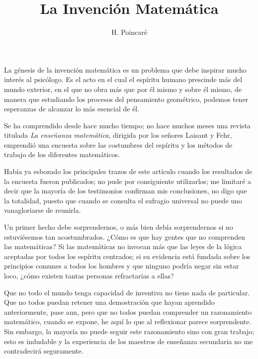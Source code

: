 \documentclass[a4paper, 12pt, draft]{article}
\title{La Invención Matemática}
\author{H. Poincaré}
\date{}
\begin{document}
\begin{tcolorbox}[colback=blue!5!white,colframe=blue!75!black]

\vspace{-1.8cm}
\textbf \maketitle

\end{tcolorbox}

\bigskip


La génesis de la invención matemática es un problema que debe
inspirar mucho interés al psicólogo. Es el acto en el cual el espíritu humano prescinde más del mundo exterior, en el que no obra más que por él mismo y sobre él mismo, de manera que estudiando
los procesos del pensamiento geométrico, podemos tener esperanzas de
alcanzar lo más esencial de él.

Se ha comprendido desde hace mucho tiempo; no hace muchos meses una revista
titulada {\it La enseñanza matemática}, dirigida por los señores
Laisant y Fehr, emprendió una encuesta sobre las costumbres del espíritu y los métodos de trabajo de los diferentes matemáticos.

Había ya esbozado los principales trazos de este artículo cuando
los resultados de la encuesta fueron publicados; no pude por consiguiente
utilizarlos; me limitaré a decir que la mayoría de los testimonios
confirman mis conclusiones, no digo que la totalidad, puesto que cuando se
consulta el sufragio universal no puede uno vanagloriarse de reunirla.

Un primer hecho debe sorprendernos, o más bien debía sorprendernos
si no estuviésemos tan acostumbrados. ¿Cómo es que hay gentes que
no comprenden las matemáticas? Si las matemáticas no invocan más
que las leyes de la lógica aceptadas por todos los espíritu
centrados; si su evidencia está fundada sobre los principios comunes a
todos los hombres y que ninguno podría negar sin estar loco, ¿cómo
existen tantas personas refractarias a ellas?

Que no todo el mundo tenga capacidad de inventiva no tiene nada de
particular. Que no todos puedan retener una demostración que hayan aprendido anteriormente, pase aun, pero que no
todos puedan comprender un razonamiento matemático, cuando se expone, he
aquí lo que al reflexionar parece sorprendente. Sin embargo, la mayoría no puede seguir este razonamiento sino con gran trabajo; esto es
indudable y la experiencia de los maestros de enseñanza secundaria no me
contradecirá seguramente.
\end{document}

